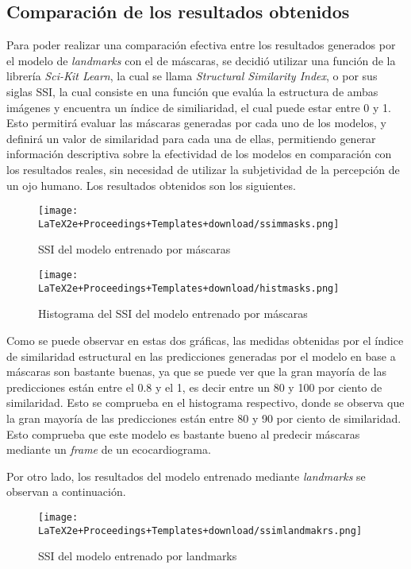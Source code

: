 \documentclass[runningheads]{llncs}
\begin{document}
\subsection{Comparación de los resultados obtenidos}
Para poder realizar una comparación efectiva entre los resultados generados por el modelo de \textit{landmarks} con el de máscaras, se decidió utilizar una función de la librería \textit{Sci-Kit Learn}, la cual se llama \textit{Structural Similarity Index}, o por sus siglas SSI, la cual consiste en una función que evalúa la estructura de ambas imágenes y encuentra un índice de similiaridad, el cual puede estar entre 0 y 1. Esto permitirá evaluar las máscaras generadas por cada uno de los modelos, y definirá un valor de similaridad para cada una de ellas, permitiendo generar información descriptiva sobre la efectividad de los modelos en comparación con los resultados reales, sin necesidad de utilizar la subjetividad de la percepción de un ojo humano. Los resultados obtenidos son los siguientes.

\begin{figure}[H]
    \centering
    \texttt{[image: LaTeX2e+Proceedings+Templates+download/ssimmasks.png]}
    \caption{SSI del modelo entrenado por máscaras}
\end{figure}

\begin{figure}[H]
    \centering
    \texttt{[image: LaTeX2e+Proceedings+Templates+download/histmasks.png]}
    \caption{Histograma del SSI del modelo entrenado por máscaras}
\end{figure}

Como se puede observar en estas dos gráficas, las medidas obtenidas por el índice de similaridad estructural en las predicciones generadas por el modelo en base a máscaras son bastante buenas, ya que se puede ver que la gran mayoría de las predicciones están entre el 0.8 y el 1, es decir entre un 80 y 100 por ciento de similaridad. Esto se comprueba en el histograma respectivo, donde se observa que la gran mayoría de las predicciones están entre 80 y 90 por ciento de similaridad. Esto comprueba que este modelo es bastante bueno al predecir máscaras mediante un \textit{frame} de un ecocardiograma. 

Por otro lado, los resultados del modelo entrenado mediante \textit{landmarks} se observan a continuación.

\begin{figure}[H]
    \centering
    \texttt{[image: LaTeX2e+Proceedings+Templates+download/ssimlandmakrs.png]}
    \caption{SSI del modelo entrenado por landmarks}
\end{figure}
\end{document}
